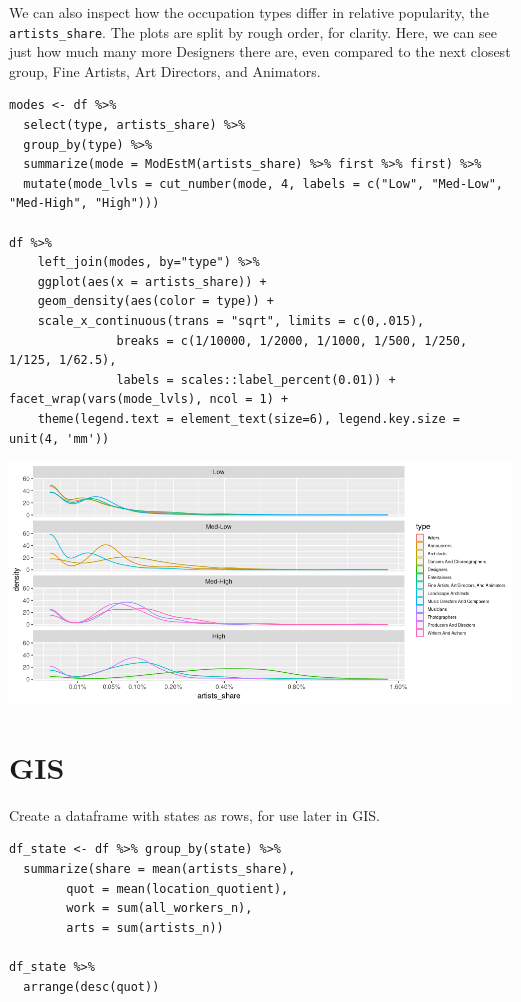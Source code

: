 \documentclass[8pt]{article}
\begin{document}
We can also inspect how the occupation types differ in relative popularity, the \texttt{artists\_share}. The plots are split by rough order, for clarity. Here, we can see just how much many more Designers there are, even compared to the next closest group, Fine Artists, Art Directors, and Animators.

\begin{verbatim}
modes <- df %>%
  select(type, artists_share) %>%
  group_by(type) %>%
  summarize(mode = ModEstM(artists_share) %>% first %>% first) %>%
  mutate(mode_lvls = cut_number(mode, 4, labels = c("Low", "Med-Low", "Med-High", "High")))

df %>%
    left_join(modes, by="type") %>%
    ggplot(aes(x = artists_share)) +
    geom_density(aes(color = type)) +
    scale_x_continuous(trans = "sqrt", limits = c(0,.015),
		       breaks = c(1/10000, 1/2000, 1/1000, 1/500, 1/250, 1/125, 1/62.5),
		       labels = scales::label_percent(0.01)) + facet_wrap(vars(mode_lvls), ncol = 1) +
    theme(legend.text = element_text(size=6), legend.key.size = unit(4, 'mm'))
\end{verbatim}

\begin{center}
\includegraphics[width=.9\linewidth]{media/share_dens.png}
\end{center}

\begin{latex}
\pagebreak
\end{latex}
\section{GIS}
\label{sec:org66247af}
Create a dataframe with states as rows, for use later in GIS.

\begin{verbatim}
df_state <- df %>% group_by(state) %>%
  summarize(share = mean(artists_share),
	    quot = mean(location_quotient),
	    work = sum(all_workers_n),
	    arts = sum(artists_n))

df_state %>%
  arrange(desc(quot))
\end{verbatim}
\end{document}
